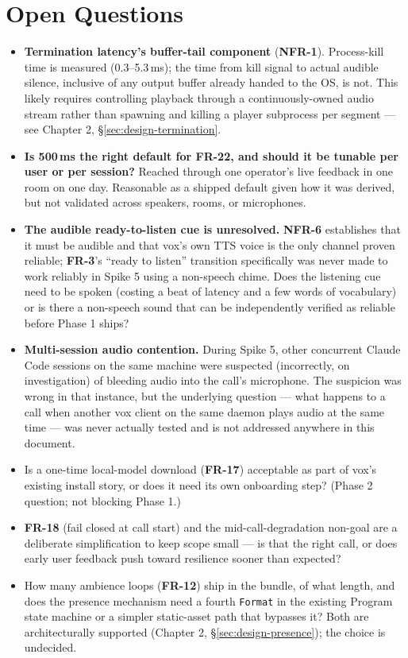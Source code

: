 \documentclass[a4paper,11pt]{report}
\newcommand{\fr}[1]{\textbf{FR-#1}}
\newcommand{\nfr}[1]{\textbf{NFR-#1}}
\begin{document}
\section{Open Questions}
\label{sec:oq}

\begin{itemize}
  \item \textbf{Termination latency's buffer-tail component} (\nfr{1}).
    Process-kill time is measured (0.3--5.3\,ms); the time from kill
    signal to actual audible silence, inclusive of any output buffer
    already handed to the OS, is not. This likely requires controlling
    playback through a continuously-owned audio stream rather than
    spawning and killing a player subprocess per segment --- see Chapter
    2, \S\ref{sec:design-termination}.
  \item \textbf{Is 500\,ms the right default for \fr{22}, and should it
    be tunable per user or per session?} Reached through one operator's
    live feedback in one room on one day. Reasonable as a shipped
    default given how it was derived, but not validated across
    speakers, rooms, or microphones.
  \item \textbf{The audible ready-to-listen cue is unresolved.}
    \nfr{6} establishes that it must be audible and that vox's own TTS
    voice is the only channel proven reliable; \fr{3}'s ``ready to
    listen'' transition specifically was never made to work reliably in
    Spike 5 using a non-speech chime. Does the listening cue need to be
    spoken (costing a beat of latency and a few words of vocabulary) or
    is there a non-speech sound that can be independently verified as
    reliable before Phase 1 ships?
  \item \textbf{Multi-session audio contention.} During Spike 5, other
    concurrent Claude Code sessions on the same machine were suspected
    (incorrectly, on investigation) of bleeding audio into the call's
    microphone. The suspicion was wrong in that instance, but the
    underlying question --- what happens to a call when another vox
    client on the same daemon plays audio at the same time --- was never
    actually tested and is not addressed anywhere in this document.
  \item Is a one-time local-model download (\fr{17}) acceptable as part of
    vox's existing install story, or does it need its own onboarding step?
    (Phase 2 question; not blocking Phase 1.)
  \item \fr{18} (fail closed at call start) and the mid-call-degradation
    non-goal are a deliberate simplification to keep scope small --- is
    that the right call, or does early user feedback push toward
    resilience sooner than expected?
  \item How many ambience loops (\fr{12}) ship in the bundle, of what
    length, and does the presence mechanism need a fourth
    \texttt{Format} in the existing Program state machine or a simpler
    static-asset path that bypasses it? Both are architecturally
    supported (Chapter 2, \S\ref{sec:design-presence}); the choice is
    undecided.
\end{itemize}
\end{document}
